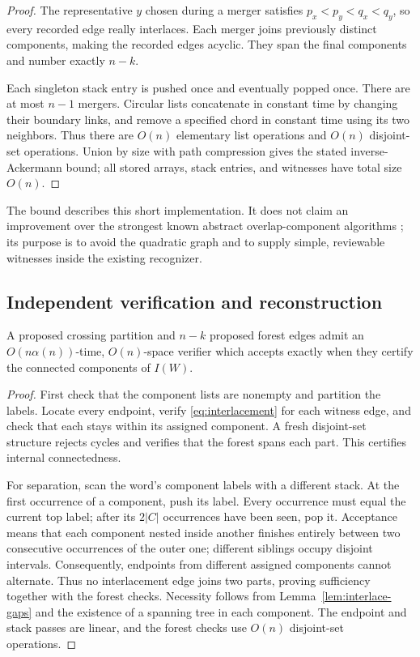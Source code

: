 \begin{proof}
The representative $y$ chosen during a merger satisfies
$p_x<p_y<q_x<q_y$, so every recorded edge really interlaces.  Each merger
joins previously distinct components, making the recorded edges acyclic.
They span the final components and number exactly $n-k$.

Each singleton stack entry is pushed once and eventually popped once.
There are at most $n-1$ mergers.  Circular lists concatenate in constant
time by changing their boundary links, and remove a specified chord in
constant time using its two neighbors.  Thus there are $O(n)$ elementary
list operations and $O(n)$ disjoint-set operations.  Union by size with
path compression gives the stated inverse-Ackermann bound; all stored
arrays, stack entries, and witnesses have total size $O(n)$.
\end{proof}

The bound describes this short implementation.  It does not claim an
improvement over the strongest known abstract overlap-component algorithms
\cite{schmidt}; its purpose is to avoid the quadratic graph and to supply
simple, reviewable witnesses inside the existing recognizer.

\subsection{Independent verification and reconstruction}

\begin{proposition}
\label{prop:interlace-verifier}
A proposed crossing partition and $n-k$ proposed forest edges admit an
$O(n\alpha(n))$-time, $O(n)$-space verifier which accepts exactly when they
certify the connected components of $I(W)$.
\end{proposition}

\begin{proof}
First check that the component lists are nonempty and partition the labels.
Locate every endpoint, verify \eqref{eq:interlacement} for each witness edge,
and check that each stays within its assigned component.  A fresh disjoint-set
structure rejects cycles and verifies that the forest spans each part.
This certifies internal connectedness.

For separation, scan the word's component labels with a different stack.
At the first occurrence of a component, push its label.  Every occurrence
must equal the current top label; after its $2|C|$ occurrences have been
seen, pop it.  Acceptance means that each component nested inside another
finishes entirely between two consecutive occurrences of the outer one;
different siblings occupy disjoint intervals.  Consequently, endpoints
from different assigned components cannot alternate.  Thus no
interlacement edge joins two parts, proving sufficiency together with the
forest checks.  Necessity follows from Lemma~\ref{lem:interlace-gaps} and
the existence of a spanning tree in each component.  The endpoint and stack
passes are linear, and the forest checks use $O(n)$ disjoint-set operations.
\end{proof}

